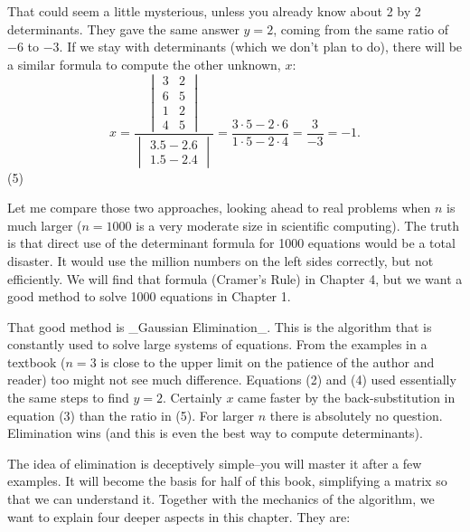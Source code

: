 That could seem a little mysterious, unless you already know about 2 by 2 determinants. They gave the same answer \(y=2\), coming from the same ratio of \(-6\) to \(-3\). If we stay with determinants (which we don't plan to do), there will be a similar formula to compute the other unknown, \(x\): \[x=\frac{\begin{vmatrix}3&2\\ 6&5\\ \hline 1&2\\ 4&5\end{vmatrix}}{\begin{vmatrix}3.5-2.6\\ 1.5-2.4\end{vmatrix}}=\frac{3\cdot 5-2\cdot 6}{1\cdot 5-2\cdot 4}=\frac{3}{-3}=-1.\] (5)

Let me compare those two approaches, looking ahead to real problems when \(n\) is much larger (\(n=1000\) is a very moderate size in scientific computing). The truth is that direct use of the determinant formula for 1000 equations would be a total disaster. It would use the million numbers on the left sides correctly, but not efficiently. We will find that formula (Cramer's Rule) in Chapter 4, but we want a good method to solve 1000 equations in Chapter 1.

That good method is _Gaussian Elimination_. This is the algorithm that is constantly used to solve large systems of equations. From the examples in a textbook (\(n=3\) is close to the upper limit on the patience of the author and reader) too might not see much difference. Equations (2) and (4) used essentially the same steps to find \(y=2\). Certainly \(x\) came faster by the back-substitution in equation (3) than the ratio in (5). For larger \(n\) there is absolutely no question. Elimination wins (and this is even the best way to compute determinants).

The idea of elimination is deceptively simple--you will master it after a few examples. It will become the basis for half of this book, simplifying a matrix so that we can understand it. Together with the mechanics of the algorithm, we want to explain four deeper aspects in this chapter. They are:


